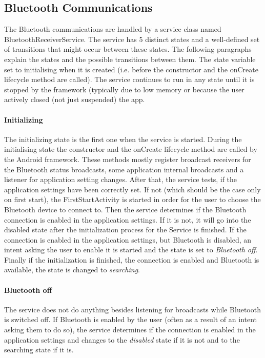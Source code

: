 \subsection{Bluetooth Communications}
\label{subs:bt-tech}
The Bluetooth communications are handled by a service class named BluetoothReceiverService. The service has 5 distinct states and a well-defined set of transitions that might occur between these states. The following paragraphs explain the states and the possible transitions between them. The state variable set to initialising when it is created (i.e. before the constructor and the onCreate lifecycle method are called). The service continues to run in any state until it is stopped by the framework (typically due to low memory or because the user actively closed (not just suspended) the app.

\paragraph{Initializing}
The initializing state is the first one when the service is started. During the initialising state the constructor and the onCreate lifecycle method are called by the Android framework. These methods mostly register broadcast receivers for the Bluetooth status broadcasts, some application internal broadcasts and a listener for application setting changes. After that, the service tests, if the application settings have been correctly set. If not (which should be the case only on first start), the FirstStartActivity is started in order for the user to choose the Bluetooth device to connect to. Then the service determines if the Bluetooth connection is enabled in the application settings. If it is not, it will go into the disabled state after the initialization process for the Service is finished. If the connection is enabled in the application settings, but Bluetooth is disabled, an intent asking the user to enable it is started and the state is set to \emph{Bluetooth off}. Finally if the initialization is finished, the connection is enabled and Bluetooth is available, the state is changed to \emph{searching}.

\paragraph{Bluetooth off}
The service does not do anything besides listening for broadcasts while Bluetooth is switched off. If Bluetooth is enabled by the user (often as a result of an intent asking them to do so), the service determines if the connection is enabled in the application settings and changes to the \emph{disabled} state if it is not and to the searching state if it is. 

